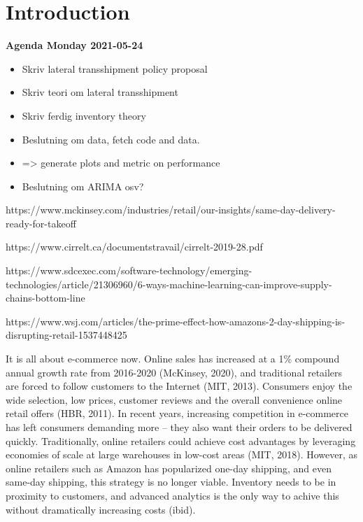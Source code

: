 \documentclass[../../main.tex]{subfiles}
\begin{document}

\chapter{Introduction}

\textbf{Agenda Monday 2021-05-24}
\begin{itemize}
\item  Skriv lateral transshipment policy proposal
\item  Skriv teori om lateral transshipment
\item  Skriv ferdig inventory theory 
\item  Beslutning om data, fetch code and data.
\item  => generate plots and metric on performance
\item  Beslutning om ARIMA osv?
\end{itemize}


https://www.mckinsey.com/industries/retail/our-insights/same-day-delivery-ready-for-takeoff

https://www.cirrelt.ca/documentstravail/cirrelt-2019-28.pdf

https://www.sdcexec.com/software-technology/emerging-technologies/article/21306960/6-ways-machine-learning-can-improve-supply-chains-bottom-line

https://www.wsj.com/articles/the-prime-effect-how-amazons-2-day-shipping-is-disrupting-retail-1537448425

It is all about e-commerce now. Online sales has increased at a 1\% compound annual growth rate from 2016-2020 (McKinsey, 2020), and traditional retailers are forced to follow customers to the Internet (MIT, 2013). Consumers enjoy the wide selection, low prices, customer reviews and the overall convenience online retail offers (HBR, 2011). In recent years, increasing competition in e-commerce has left consumers demanding more – they also want their orders to be delivered quickly. Traditionally, online retailers could achieve cost advantages by leveraging economies of scale at large warehouses in low-cost areas (MIT, 2018). However, as online retailers such as Amazon has popularized one-day shipping, and even same-day shipping, this strategy is no longer viable. Inventory needs to be in proximity to  customers, and advanced analytics is the only way to achive this without dramatically increasing costs (ibid).
\end{document}
